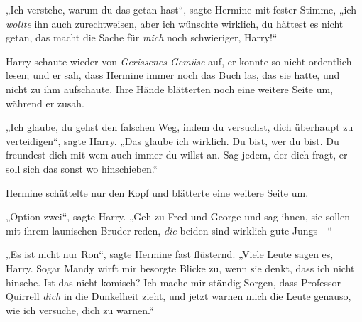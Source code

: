 „Ich verstehe, warum du das getan hast“, sagte Hermine mit fester Stimme, „ich \emph{wollte} ihn auch zurechtweisen, aber ich wünschte wirklich, du hättest es nicht getan, das macht die Sache für \emph{mich} noch schwieriger, Harry!“

Harry schaute wieder von \emph{Gerissenes Gemüse} auf, er konnte so nicht ordentlich lesen; und er sah, dass Hermine immer noch das Buch las, das sie hatte, und nicht zu ihm aufschaute. Ihre Hände blätterten noch eine weitere Seite um, während er zusah.

„Ich glaube, du gehst den falschen Weg, indem du versuchst, dich überhaupt zu verteidigen“, sagte Harry. „Das glaube ich wirklich. Du bist, wer du bist. Du freundest dich mit wem auch immer du willst an. Sag jedem, der dich fragt, er soll sich das sonst wo hinschieben.“

Hermine schüttelte nur den Kopf und blätterte eine weitere Seite um.

„Option zwei“, sagte Harry. „Geh zu Fred und George und sag ihnen, sie sollen mit ihrem launischen Bruder reden, \emph{die} beiden sind wirklich gute Jungs—“

„Es ist nicht nur Ron“, sagte Hermine fast flüsternd. „Viele Leute sagen es, Harry. Sogar Mandy wirft mir besorgte Blicke zu, wenn sie denkt, dass ich nicht hinsehe. Ist das nicht komisch? Ich mache mir ständig Sorgen, dass Professor Quirrell \emph{dich} in die Dunkelheit zieht, und jetzt warnen mich die Leute genauso, wie ich versuche, dich zu warnen.“

